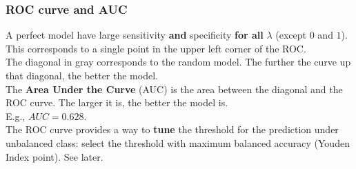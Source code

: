 \begin{frame}
\frametitle{ROC curve and AUC}
A perfect model have large sensitivity {\bf and} specificity {\bf for all} $\lambda$ (except $0$ and $1$). This corresponds to a single point in the upper left corner of the ROC.\\
\vspace{0.2cm}
The diagonal in gray corresponds to the random model. The further the curve up that diagonal, the better the model. \\
\vspace{0.2cm}
The {\bf Area Under the Curve} (AUC) is the area between the diagonal and the ROC curve. The larger it is, the better the model is.\\
\vspace{0.2cm}
E.g., $AUC=0.628$.\\
\vspace{0.2cm}
The ROC curve provides a way to {\bf tune} the threshold for the prediction under unbalanced class: select the threshold with maximum balanced accuracy (Youden Index point). See later.
\end{frame}
